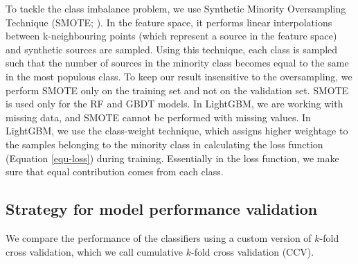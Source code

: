 \documentclass[fleqn,usenatbib]{mnras}
\begin{document}
        To tackle the class imbalance problem, we use Synthetic Minority Oversampling Technique (SMOTE; \cite{2011arXiv1106.1813C}). In the feature space, it performs linear interpolations between k-neighbouring points (which represent a source in the feature space) and synthetic sources are sampled. Using this technique, each class is sampled such that the number of sources in the minority class becomes equal to the same in the most populous class. To keep our result insensitive to the oversampling, we perform SMOTE only on the training set and not on the validation set. SMOTE is used only for the RF and GBDT models. In LightGBM, we are working with missing data, and SMOTE cannot be performed with missing values. In LightGBM, we use the class-weight technique, which assigns higher weightage to the samples belonging to the minority class in calculating the loss function (Equation \ref{equ-loss}) during training. Essentially in the loss function, we make sure that equal contribution comes from each class. 
       
        
    
    \subsection{Strategy for model performance validation}\label{sec:ccv-method}
    We compare the performance of the classifiers using a custom version of $k$-fold cross validation, which we call cumulative $k$-fold cross validation (CCV).
    
\end{document}
